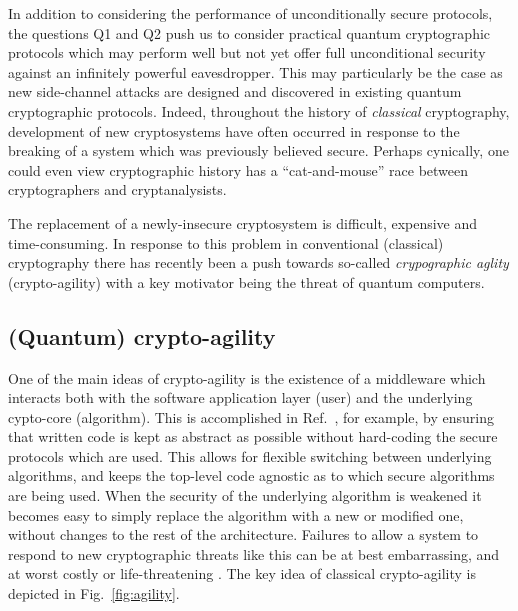In addition to considering the performance of unconditionally secure protocols, the questions Q1 and Q2 push us to consider practical quantum cryptographic protocols which may perform well but not yet offer full unconditional security against an infinitely powerful eavesdropper. This may particularly be the case as new side-channel attacks are designed and discovered in existing quantum cryptographic protocols. Indeed, throughout the history of \emph{classical} cryptography, development of new cryptosystems have often occurred in response to the breaking of a system which was previously believed secure. Perhaps cynically, one could even view cryptographic history has a ``cat-and-mouse'' race between cryptographers and cryptanalysists.%

The replacement of a newly-insecure cryptosystem is difficult, expensive and time-consuming. In response to this problem in conventional (classical) cryptography there has recently been a push towards so-called \emph{crypographic aglity} (crypto-agility) \cite{Sullivan2009, Chen2016} with a key motivator being the threat of quantum computers. 

\subsection{(Quantum) crypto-agility}

One of the main ideas of crypto-agility is the existence of a middleware which interacts both with the software application layer (user) and the underlying cypto-core (algorithm). This is accomplished in Ref.~\cite{Sullivan2009}, for example, by ensuring that written code is kept as abstract as possible without hard-coding the secure protocols which are used. This allows for flexible switching between underlying algorithms, and keeps the top-level code agnostic as to which secure algorithms are being used. When the security of the underlying algorithm is weakened it becomes easy to simply replace the algorithm with a new or modified one, without changes to the rest of the architecture. Failures to allow a system to respond to new cryptographic threats like this can be at best embarrassing, and at worst costly or life-threatening \cite{Schneier2016, Schneier2017}. The key idea of classical crypto-agility is depicted in Fig.~\ref{fig:agility}. 


